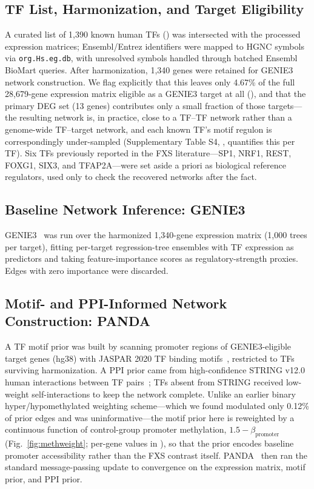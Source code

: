 \documentclass[journal]{IEEEtran}
\begin{document}
\subsection{TF List, Harmonization, and Target Eligibility}
A curated list of 1,390 known human TFs () was intersected with the processed expression matrices; Ensembl/Entrez identifiers were mapped to HGNC symbols via \texttt{org.Hs.eg.db}, with unresolved symbols handled through batched Ensembl BioMart queries. After harmonization, 1,340 genes were retained for GENIE3 network construction. We flag explicitly that this leaves only 4.67\% of the full 28,679-gene expression matrix eligible as a GENIE3 target at all (), and that the primary DEG set (13 genes) contributes only a small fraction of those targets---the resulting network is, in practice, close to a TF--TF network rather than a genome-wide TF--target network, and each known TF's motif regulon is correspondingly under-sampled (Supplementary Table S4, , quantifies this per TF). Six TFs previously reported in the FXS literature---SP1, NRF1, REST, FOXG1, SIX3, and TFAP2A---were set aside a priori as biological reference regulators, used only to check the recovered networks after the fact.

\subsection{Baseline Network Inference: GENIE3}
GENIE3~\cite{genie3} was run over the harmonized 1,340-gene expression matrix (1,000 trees per target), fitting per-target regression-tree ensembles with TF expression as predictors and taking feature-importance scores as regulatory-strength proxies. Edges with zero importance were discarded.

\subsection{Motif- and PPI-Informed Network Construction: PANDA}
A TF motif prior was built by scanning promoter regions of GENIE3-eligible target genes (hg38) with JASPAR 2020 TF binding motifs~\cite{jaspar2020}, restricted to TFs surviving harmonization. A PPI prior came from high-confidence STRING v12.0 human interactions between TF pairs~\cite{string2023}; TFs absent from STRING received low-weight self-interactions to keep the network complete. Unlike an earlier binary hyper/hypomethylated weighting scheme---which we found modulated only 0.12\% of prior edges and was uninformative---the motif prior here is reweighted by a continuous function of control-group promoter methylation, $1.5-\beta_{\text{promoter}}$ (Fig.~\ref{fig:methweight}; per-gene values in ), so that the prior encodes baseline promoter accessibility rather than the FXS contrast itself. PANDA~\cite{panda} then ran the standard message-passing update to convergence on the expression matrix, motif prior, and PPI prior.
\end{document}
